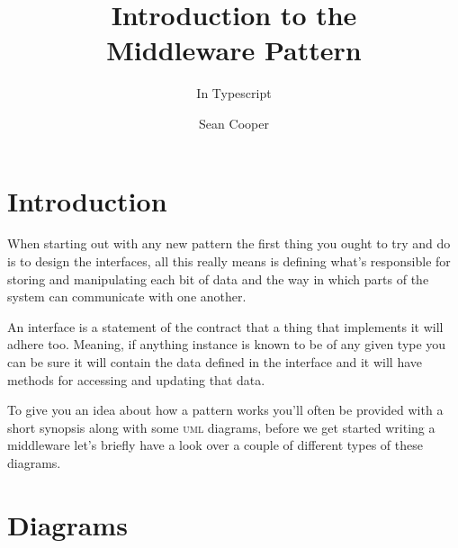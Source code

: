 \documentclass[12pt]{article}
\title{Introduction to the \\ Middleware Pattern}
\subtitle{In Typescript}
\author{Sean Cooper}
\begin{document}

\maketitle
\pagebreak
{}
\section{Introduction}
When starting out with any new pattern the first thing you ought to try and do is to design the interfaces, all this really means is defining what's responsible for storing and manipulating each bit of data and the way in which parts of the system can communicate with one another. 
\par An interface is a statement of the contract that a thing that implements it will adhere too. Meaning, if anything instance is known to be of any given type you can be sure it will contain the data defined in the interface and it will have methods for accessing and updating that data. 
\par To give you an idea about how a pattern works you'll often be provided with a short synopsis along with some \textsc{uml} diagrams, before we get started writing a middleware let's briefly have a look over a couple of different types of these diagrams.
\section{Diagrams}
\end{document}
